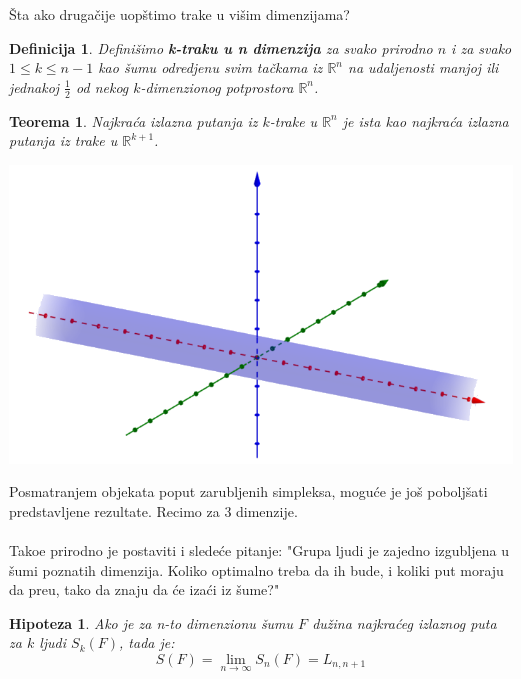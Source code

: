 \documentclass[b1paper,portrait]{template/baposter}
\newtheorem{theorem}{Teorema}
\newtheorem*{definition}{Definicija}
\newtheorem*{hipoteza}{Hipoteza}
\begin{document}
\begin{poster}
{
	\v Sta ako druga\v cije uop\v stimo trake u vi\v sim dimenzijama? \\
	\begin{definition}
		Defini\v simo \textbf{k-traku u n dimenzija} za svako prirodno $n$ i za svako $1\leqslant k\leqslant n-1$  kao \v sumu odredjenu
		svim ta\v ckama iz $\mathbb{R}^n$ na udaljenosti manjoj ili jednakoj $\frac{1}{2}$ od nekog $k$-dimenzionog potprostora $\mathbb{R}^n$. 
	\end{definition}
	\begin{theorem}
		Najkra\' ca izlazna putanja iz $k$-trake u $\mathbb{R}^n$ je ista kao najkra\' ca izlazna putanja iz trake u $\mathbb{R}^{k+1}$.
	\end{theorem}
	 \begin{center}
	 	\begin{minipage}{0.25\linewidth}
			\includegraphics[width=\linewidth]{Valjak}
		\end{minipage}
	\end{center}
	\vspace{0.15cm}
}




{
	Posmatranjem objekata poput zarubljenih simpleksa, mogu\' ce je jo\v s pobolj\v sati predstavljene rezultate. Recimo za 3 dimenzije.\\ \\
	Tako\dj e prirodno je postaviti i slede\' ce pitanje:
	"Grupa ljudi je zajedno izgubljena u \v sumi poznatih dimenzija. Koliko optimalno treba da ih bude,
	i koliki put moraju da pre\dj u, tako da znaju da \' ce iza\' ci iz \v sume?"
	\begin{hipoteza}
		Ako je za n-to dimenzionu \v sumu $F$ du\v zina najkra\' ceg izlaznog puta za $k$ ljudi $S_k(F)$, tada je:
		$$S(F)=\lim_{n \to \infty} S_n(F) = L_{n,n+1}$$
	\end{hipoteza}
	\vspace{0.15cm}
}

\end{poster}
\end{document}
